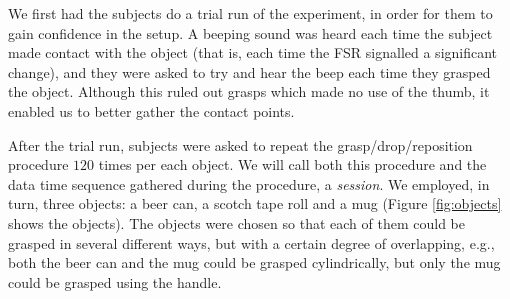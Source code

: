 We first had the subjects do a trial run of the experiment, in order
for them to gain confidence in the setup. A beeping sound was heard
each time the subject made contact with the object (that is, each time
the FSR signalled a significant change), and they were asked to try
and hear the beep each time they grasped the object. Although this
ruled out grasps which made no use of the thumb, it enabled us to
better gather the contact points.

After the trial run, subjects were asked to repeat the
grasp/drop/reposition procedure $120$ times per each object. We will
call both this procedure and the data time sequence gathered during
the procedure, a \emph{session}. We employed, in turn, three objects:
a beer can, a scotch tape roll and a mug (Figure \ref{fig:objects}
shows the objects). The objects were chosen so that each of them could be
grasped in several different ways, but with a certain degree of
overlapping, e.g., both the beer can and the mug could be grasped
cylindrically, but only the mug could be grasped using the handle.

